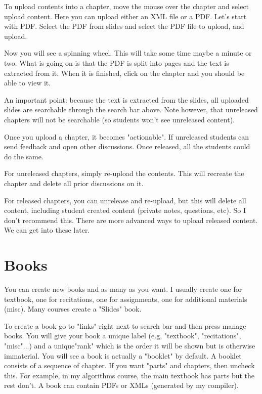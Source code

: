 \begin{gram}
To upload contents into a chapter, move the mouse over the chapter and
select upload content.  Here you can upload either an XML
file or a PDF.  Let's start with PDF.  Select the PDF from
slides and select the PDF file to upload, and upload.  

Now you will see a spinning wheel.  This will take some time maybe a
minute or two.  What is going on is that the PDF is split into pages
and the text is extracted from it.  When it is finished, click on the
chapter and you should be able to view it.  

An important point: because the text is extracted from the slides, all
uploaded slides are searchable through the search bar above.  Note
however, that unreleased chapters will not be searchable (so students
won't see unreleased content).
\end{gram}

\begin{gram}[Usage]
Once you upload a chapter, it becomes "actionable".  If unreleased students can send feedback and open other discussions. Once released, all the students could do the same.  
\end{gram}

\begin{gram}

For unreleased chapters, simply re-upload the contents.  This will
recreate the chapter and delete all prior discussions on it.  

For released chapters, you can unrelease and re-upload, but this will
delete all content, including student created content (private notes,
questions, etc).  So I don't recommend this.  There are more advanced
ways to upload released content.  We can get into these later.
\end{gram}

\section{Books}

\begin{gram}
You can create new books and as many as you want.  I usually create one for textbook, one for recitations, one for assignments, one for additional materials (misc).  Many courses create a "Slides" book.  

To create a book go to "links" right next to search bar and then press
manage books.  You will give your book a unique label (e.g,
"textbook", "recitations", "misc"...) and a unique"rank" which is the
order it will be shown but is otherwise immaterial.  You will see a
book is actually a "booklet" by default.  A booklet consists of a
sequence of chapter.  If you want "parts" and chapters, then uncheck
this.  For example, in my algorithms course, the main textbook has
parts but the rest don't.  A book can contain PDFs or XMLs (generated
by my compiler).
\end{gram}


